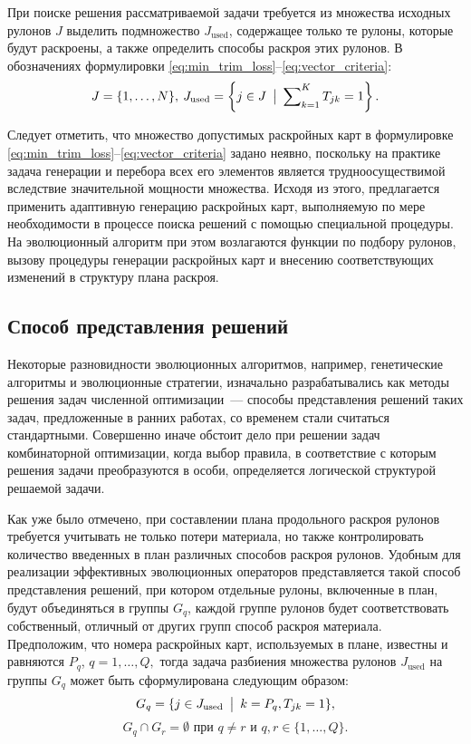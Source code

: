 \documentclass[12pt]{article}
\begin{document}
При поиске решения рассматриваемой задачи требуется из множества исходных 
рулонов $J$ выделить подмножество $J_{\text{used}}$, содержащее только те 
рулоны, которые будут раскроены, а также определить способы раскроя этих 
рулонов. В обозначениях формулировки 
\eqref{eq:min_trim_loss}--\eqref{eq:vector_criteria}:
\[ J=\{1,\ldots,N\},\: 
   J_{\text{used}}=\left\{ j \in J \: \bigm| \: \sum\nolimits_{k=1}^{K} T_{jk}=1 \right\}. \]

Следует отметить, что множество допустимых раскройных карт в формулировке 
\eqref{eq:min_trim_loss}--\eqref{eq:vector_criteria} 
задано неявно, поскольку на практике задача генерации и перебора всех 
его элементов является трудноосуществимой вследствие значительной мощности 
множества. Исходя из этого, предлагается применить адаптивную генерацию 
раскройных карт, выполняемую по мере необходимости в процессе поиска решений 
с помощью специальной процедуры. На эволюционный алгоритм при этом возлагаются 
функции по подбору рулонов, вызову процедуры генерации раскройных карт и 
внесению соответствующих изменений в структуру плана раскроя.

\subsection{Способ представления решений}

Некоторые разновидности эволюционных алгоритмов, например, генетические
алгоритмы и эволюционные стратегии, изначально разрабатывались как методы 
решения задач численной оптимизации~--- способы представления решений таких 
задач, предложенные в ранних работах, со временем стали считаться стандартными. 
Совершенно иначе обстоит дело при решении задач комбинаторной оптимизации, 
когда выбор правила, в соответствие с которым решения задачи преобразуются в 
особи, определяется логической структурой решаемой задачи.

Как уже было отмечено, при составлении плана продольного раскроя рулонов 
требуется учитывать не только потери материала, но также контролировать 
количество введенных в план различных способов раскроя рулонов. Удобным для 
реализации эффективных эволюционных операторов представляется такой способ 
представления решений, при котором отдельные рулоны, включенные в план, 
будут объединяться в группы $G_q$, каждой группе рулонов будет соответствовать 
собственный, отличный от других групп способ раскроя материала. Предположим, 
что номера раскройных карт, используемых в плане, известны и равняются $P_q$, 
$q=1,\ldots,Q,$ тогда задача разбиения множества рулонов $J_{\text{used}}$ 
на группы $G_q$ может быть сформулирована следующим образом:
\[ G_q=\{ j \in J_{\text{used}} \: \bigm| \: k=P_q,T_{jk}=1 \}, \]
\[ G_q \cap G_r=\emptyset \text{ при } q \neq r \text{ и } q,r \in \{1,\ldots,Q\}. \]
\end{document}
